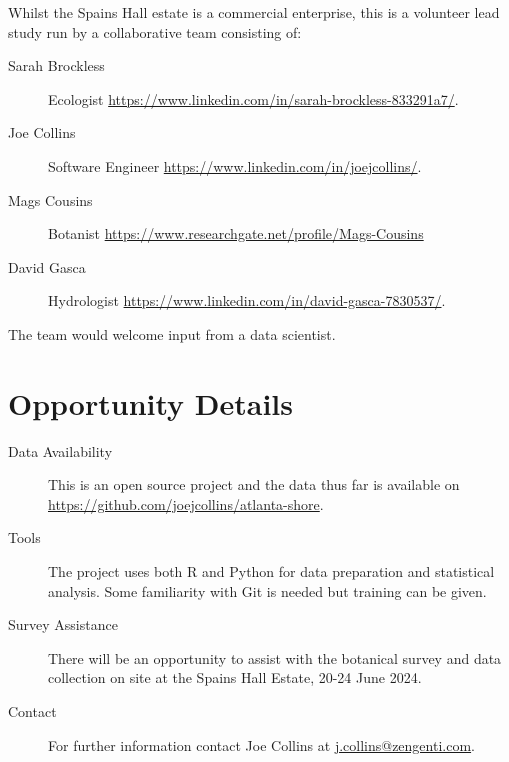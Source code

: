 \documentclass{roles}
\begin{document}
Whilst the Spains Hall estate is a commercial enterprise,
this is a volunteer lead study
run by a collaborative team consisting of:

\begin{description}
    \item[Sarah Brockless] Ecologist \href{https://www.linkedin.com/in/sarah-brockless-833291a7/}{https://www.linkedin.com/in/sarah-brockless-833291a7/}.
    \item[Joe Collins] Software Engineer \href{https://www.linkedin.com/in/joejcollins/}{https://www.linkedin.com/in/joejcollins/}.
    \item[Mags Cousins] Botanist \href{https://www.researchgate.net/profile/Mags-Cousins}{https://www.researchgate.net/profile/Mags-Cousins}
    \item[David Gasca] Hydrologist \href{https://www.linkedin.com/in/david-gasca-7830537/}{https://www.linkedin.com/in/david-gasca-7830537/}.
\end{description}

The team would welcome input from a data scientist.

\section*{Opportunity Details}

\begin{description}
    \item[Data Availability] This is an open source project and
        the data thus far is available on \href{https://github.com/joejcollins/atlanta-shore}{https://github.com/joejcollins/atlanta-shore}.
    \item[Tools] The project uses both R and Python for data preparation and statistical analysis.
        Some familiarity with Git is needed but training can be given.
    \item[Survey Assistance] There will be an opportunity to assist with the botanical survey
        and data collection on site at the Spains Hall Estate, 20-24 June 2024.
    \item[Contact] For further information contact Joe Collins at \href{mailto:j.collins@zengenti.com}{j.collins@zengenti.com}.
\end{description}
\end{document}
